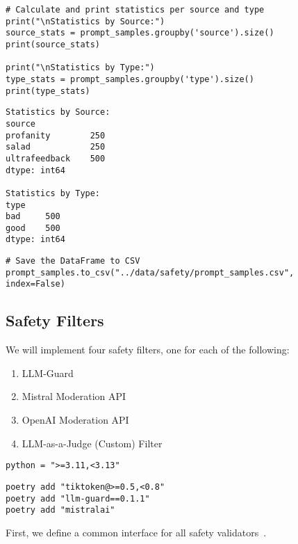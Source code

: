 \begin{verbatim}
# Calculate and print statistics per source and type
print("\nStatistics by Source:")
source_stats = prompt_samples.groupby('source').size()
print(source_stats)

print("\nStatistics by Type:")
type_stats = prompt_samples.groupby('type').size() 
print(type_stats)
\end{verbatim}

\begin{verbatim}
Statistics by Source:
source
profanity        250
salad            250
ultrafeedback    500
dtype: int64

Statistics by Type:
type
bad     500
good    500
dtype: int64
\end{verbatim}


\begin{verbatim}
# Save the DataFrame to CSV
prompt_samples.to_csv("../data/safety/prompt_samples.csv", index=False)
\end{verbatim}

\subsection{Safety Filters}

We will implement four safety filters, one for each of the following:
\begin{enumerate}
\item LLM-Guard
\item Mistral Moderation API
\item OpenAI Moderation API 
\item LLM-as-a-Judge (Custom) Filter
\end{enumerate}

\begin{verbatim}
python = ">=3.11,<3.13"
\end{verbatim}

\begin{verbatim}
poetry add "tiktoken@>=0.5,<0.8"
poetry add "llm-guard==0.1.1"
poetry add "mistralai"
\end{verbatim}


First, we define a common interface for all safety validators~.

